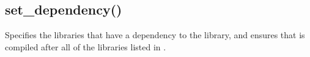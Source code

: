 \documentclass[letterpaper,10pt,english]{sphinxmanual}
\begin{document}
\subsection{set\_dependency()}
\label{\detokenize{api:set-dependency}}
\sphinxAtStartPar
Specifies the libraries that have a dependency to the  library, and ensures that  is
compiled after all of the libraries listed in .

\begin{sphinxVerbatim}[commandchars=\\\{\}]
 
\end{sphinxVerbatim}
\end{document}

